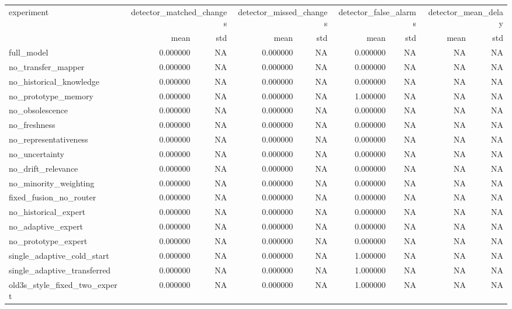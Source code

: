\begin{tabular}{lrrrrrrrr}
\toprule
experiment & \multicolumn{2}{r}{detector\_matched\_changes} & \multicolumn{2}{r}{detector\_missed\_changes} & \multicolumn{2}{r}{detector\_false\_alarms} & \multicolumn{2}{r}{detector\_mean\_delay} \\
 & mean & std & mean & std & mean & std & mean & std \\
\midrule
full\_model & 0.000000 & NA & 0.000000 & NA & 0.000000 & NA & NA & NA \\
no\_transfer\_mapper & 0.000000 & NA & 0.000000 & NA & 0.000000 & NA & NA & NA \\
no\_historical\_knowledge & 0.000000 & NA & 0.000000 & NA & 0.000000 & NA & NA & NA \\
no\_prototype\_memory & 0.000000 & NA & 0.000000 & NA & 1.000000 & NA & NA & NA \\
no\_obsolescence & 0.000000 & NA & 0.000000 & NA & 0.000000 & NA & NA & NA \\
no\_freshness & 0.000000 & NA & 0.000000 & NA & 0.000000 & NA & NA & NA \\
no\_representativeness & 0.000000 & NA & 0.000000 & NA & 0.000000 & NA & NA & NA \\
no\_uncertainty & 0.000000 & NA & 0.000000 & NA & 0.000000 & NA & NA & NA \\
no\_drift\_relevance & 0.000000 & NA & 0.000000 & NA & 0.000000 & NA & NA & NA \\
no\_minority\_weighting & 0.000000 & NA & 0.000000 & NA & 0.000000 & NA & NA & NA \\
fixed\_fusion\_no\_router & 0.000000 & NA & 0.000000 & NA & 0.000000 & NA & NA & NA \\
no\_historical\_expert & 0.000000 & NA & 0.000000 & NA & 0.000000 & NA & NA & NA \\
no\_adaptive\_expert & 0.000000 & NA & 0.000000 & NA & 0.000000 & NA & NA & NA \\
no\_prototype\_expert & 0.000000 & NA & 0.000000 & NA & 0.000000 & NA & NA & NA \\
single\_adaptive\_cold\_start & 0.000000 & NA & 0.000000 & NA & 1.000000 & NA & NA & NA \\
single\_adaptive\_transferred & 0.000000 & NA & 0.000000 & NA & 1.000000 & NA & NA & NA \\
old3s\_style\_fixed\_two\_expert & 0.000000 & NA & 0.000000 & NA & 1.000000 & NA & NA & NA \\
\bottomrule
\end{tabular}

